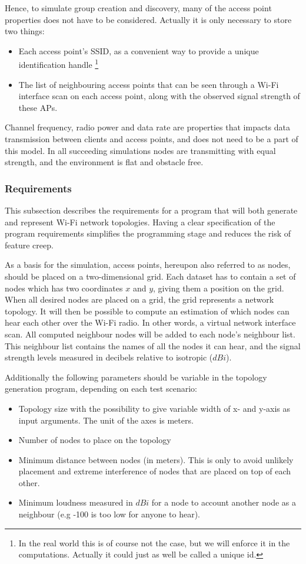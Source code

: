 Hence, to simulate group creation and discovery, many of the access point properties does not have to be considered. Actually it is only necessary to store two things:
\begin{itemize}
	\item Each access point's SSID, as a convenient way to provide a unique identification handle \footnote{In the real world this is of course not the case,
but we will enforce it in the computations. Actually it could just as well be called a unique id.}
	\item The list of neighbouring access points that can be seen through a Wi-Fi interface scan on each access point, along with the observed signal strength of these APs.
\end{itemize}
Channel frequency, radio power and data rate are properties that impacts data transmission between clients and access points, and does not need to be a 
part of this model. 
In all succeeding simulations nodes are transmitting with equal strength, and the environment is flat and obstacle free. 


\subsubsection{Requirements}
This subsection describes the requirements for a program that will both generate and represent Wi-Fi network topologies. Having a clear specification of the program requirements
simplifies the programming stage and reduces the risk of feature creep. 

As a basis for the simulation, access points, hereupon also referred to as nodes, should be placed on a two-dimensional grid. Each dataset has to contain a set of nodes which has two coordinates $x$ and $y$, giving them a position on the grid. When all desired nodes are placed on a grid, the grid represents a network topology. It will then be possible to compute an
estimation of which nodes can hear each other over the Wi-Fi radio. In other words, a virtual network interface scan. All computed neighbour nodes will be added to each node's
neighbour list. This neighbour list contains the names of all the nodes it can hear, and the signal strength levels measured in decibels relative to isotropic ($dBi$).

Additionally the following parameters should be variable in the topology generation program, depending on each test scenario:

\begin{itemize}
	\item Topology size with the possibility to give variable width of x- and y-axis as input arguments. The unit of the axes is meters. 
	\item Number of nodes to place on the topology
	\item Minimum distance between nodes (in meters). This is only to avoid unlikely placement and extreme interference of nodes that are placed on top of each other. 
	\item Minimum loudness measured in $dBi$ for a node to account another node as a neighbour (e.g -100 is too low for anyone to hear).
\end{itemize}


